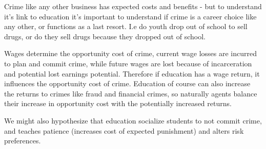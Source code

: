 \documentclass[12pt, a4paper]{article}
\begin{document}
\begin{multicols}{2}
Crime like any other business has expected costs and benefits - but to understand it's link to education it's important to understand if crime is a career choice like any other, or functions as a last resort. I.e do youth drop out of school to sell drugs, or do they sell drugs because they dropped out of school. 

Wages determine the opportunity cost of crime, current wage losses are incurred to plan and commit crime, while future wages are lost because of incarceration and potential lost earnings potential. Therefore if education has a wage return, it influences the opportunity cost of crime. Education of course can also increase the returns to crimes like fraud and financial crimes, so naturally agents balance their increase in opportunity cost with the potentially increased returns. 

We might also hypothesize that education socialize students to not commit crime, and teaches patience (increases cost of expected punishment) and alters risk preferences. 


\end{multicols}
\end{document}
